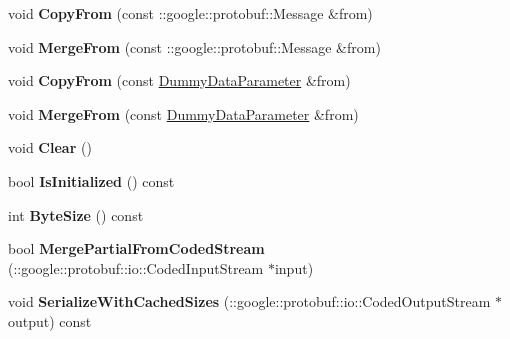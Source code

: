 \begin{DoxyCompactItemize}
void {\bfseries Copy\+From} (const \+::google\+::protobuf\+::\+Message \&from)
\item 
\mbox{\label{classcaffe_1_1_dummy_data_parameter_ae5028fef94da873eda440a049239e15b}} 
void {\bfseries Merge\+From} (const \+::google\+::protobuf\+::\+Message \&from)
\item 
\mbox{\label{classcaffe_1_1_dummy_data_parameter_a29e79bfdd9b0f0bd85663d18c4d7d1ff}} 
void {\bfseries Copy\+From} (const \mbox{\hyperlink{classcaffe_1_1_dummy_data_parameter}{Dummy\+Data\+Parameter}} \&from)
\item 
\mbox{\label{classcaffe_1_1_dummy_data_parameter_afa19a88e08c9bf8a979e8f481b5d8386}} 
void {\bfseries Merge\+From} (const \mbox{\hyperlink{classcaffe_1_1_dummy_data_parameter}{Dummy\+Data\+Parameter}} \&from)
\item 
\mbox{\label{classcaffe_1_1_dummy_data_parameter_a4e171993e62681a1e9e4d270c0b5b12c}} 
void {\bfseries Clear} ()
\item 
\mbox{\label{classcaffe_1_1_dummy_data_parameter_a51d415ec15fe8961bd3ff21d7d7011a6}} 
bool {\bfseries Is\+Initialized} () const
\item 
\mbox{\label{classcaffe_1_1_dummy_data_parameter_abe5c3bb25d15065a9a1bd5a1628a44fc}} 
int {\bfseries Byte\+Size} () const
\item 
\mbox{\label{classcaffe_1_1_dummy_data_parameter_a85fecf138cc8fe333cb9295461cd423f}} 
bool {\bfseries Merge\+Partial\+From\+Coded\+Stream} (\+::google\+::protobuf\+::io\+::\+Coded\+Input\+Stream $\ast$input)
\item 
\mbox{\label{classcaffe_1_1_dummy_data_parameter_ab8ebe6146f7b88c537758015f54c5177}} 
void {\bfseries Serialize\+With\+Cached\+Sizes} (\+::google\+::protobuf\+::io\+::\+Coded\+Output\+Stream $\ast$output) const
\item 
\mbox{\label{classcaffe_1_1_dummy_data_parameter_ac049c69689b05c284b2c0afca874e6ce}} 

\end{DoxyCompactItemize}
